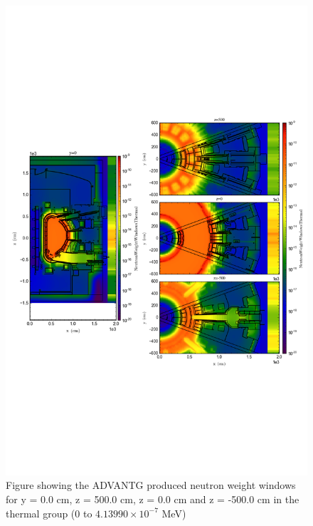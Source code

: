 \documentclass[12pt]{article}
\begin{document}
\begin{figure}[ht!]
  \centering
  \includegraphics[trim={0cm 9cm 0cm 10cm},clip,scale=0.75]{../plots/wwinp/Neutron_Weight_Windows_Thermal.png}
  \caption{Figure showing the ADVANTG produced neutron weight windows for y = 0.0 cm,
  z = 500.0 cm, z = 0.0 cm and z = -500.0 cm in the thermal group (0 to $4.13990\times10^{-7}$ MeV)}
  \label{fig:wwinp_thermal}
\end{figure}
\end{document}
